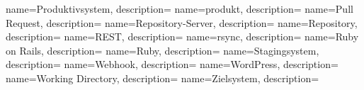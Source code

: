  {
  name=Produktivsystem,
  description={}
}
 {
  name=produkt,
  description={}
}
 {
  name=Pull Request,
  description={}
}
 {
  name=Repository-Server,
  description={}
}
 {
  name=Repository,
  description={}
}
 {
  name=REST,
  description={}
}
 {
  name=rsync,
  description={}
}
 {
  name=Ruby on Rails,
  description={}
}
 {
  name=Ruby,
  description={}
}
 {
  name=Stagingsystem,
  description={}
}
 {
  name=Webhook,
  description={}
}
 {
  name=WordPress,
  description={}
}
 {
  name=Working Directory,
  description={}
}
 {
  name=Zielsystem,
  description={}
}


\makeglossaries
